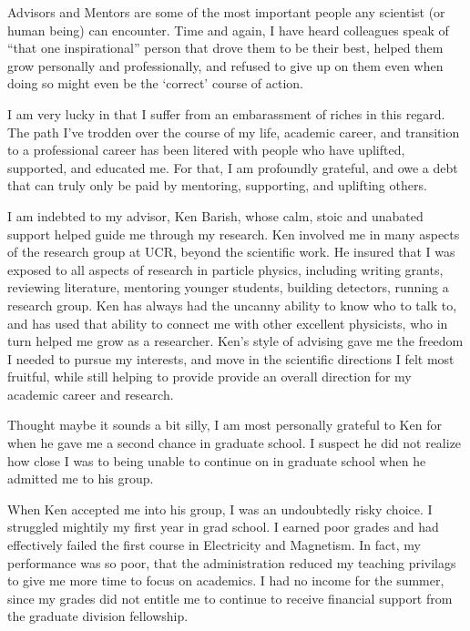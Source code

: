 Advisors and Mentors are some of the most important people any scientist (or
human being) can encounter. Time and again, I have heard colleagues speak of
``that one inspirational'' person that drove them to be their best, helped them
grow personally and professionally, and refused to give up on them even when
doing so might even be the `correct' course of action.

I am very lucky in that I suffer from an embarassment of riches in this regard.
The path I've trodden over the course of my life, academic career, and
transition to a professional career has been litered with people who have
uplifted, supported, and educated me. For that, I am profoundly grateful, and
owe a debt that can truly only be paid by mentoring, supporting, and uplifting
others.

I am indebted to my advisor, Ken Barish, whose calm, stoic and unabated support
helped guide me through my research. Ken involved me in many aspects of the
research group at UCR, beyond the scientific work. He insured that I was
exposed to all aspects of research in particle physics, including writing
grants, reviewing literature, mentoring younger students, building detectors,
running a research group.  Ken has always had the uncanny ability to know who
to talk to, and has used that ability to connect me with other excellent
physicists, who in turn helped me grow as a researcher. Ken's style of advising
gave me the freedom I needed to pursue my interests, and move in the scientific
directions I felt most fruitful, while still helping to provide provide an
overall direction for my academic career and research. 

Thought maybe it sounds a bit silly, I am most personally grateful to Ken for
when he gave me a second chance in graduate school. I suspect he did not
realize how close I was to being unable to continue on in graduate school when
he admitted me to his group.

When Ken accepted me into his group, I was an undoubtedly risky choice. I
struggled mightily my first year in grad school.  I earned poor grades and had
effectively failed the first course in Electricity and Magnetism. In fact, my
performance was so poor, that the administration reduced my teaching privilags
to give me more time to focus on academics. I had no income for the summer,
since my grades did not entitle me to continue to receive financial support
from the graduate division fellowship.

